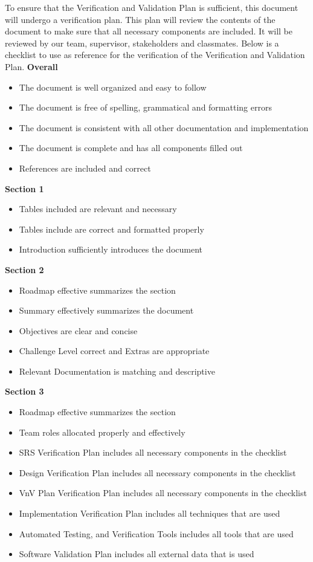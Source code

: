 \documentclass[12pt, titlepage]{article}
\begin{document}
To ensure that the Verification and Validation Plan is sufficient, this document will undergo a verification plan.
This plan will review the contents of the document to make sure that all necessary components are included.
It will be reviewed by our team, supervisor, stakeholders and classmates.
Below is a checklist to use as reference for the verification of the Verification and Validation Plan.
\bigskip
\newline
\textbf{Overall}
\begin{itemize}
  \item The document is well organized and easy to follow
  \item The document is free of spelling, grammatical and formatting errors
  \item The document is consistent with all other documentation and implementation
  \item The document is complete and has all components filled out
  \item References are included and correct
\end{itemize}
\noindent
\textbf{Section 1}
\begin{itemize}
  \item Tables included are relevant and necessary
  \item Tables include are correct and formatted properly
  \item Introduction sufficiently introduces the document
\end{itemize}
\noindent
\textbf{Section 2}
\begin{itemize}
  \item Roadmap effective summarizes the section
  \item Summary effectively summarizes the document
  \item Objectives are clear and concise
  \item Challenge Level correct and Extras are appropriate
  \item Relevant Documentation is matching and descriptive
\end{itemize}
\noindent
\textbf{Section 3}
\begin{itemize}
  \item Roadmap effective summarizes the section
  \item Team roles allocated properly and effectively
  \item SRS Verification Plan includes all necessary components in the checklist
  \item Design Verification Plan includes all necessary components in the checklist
  \item VnV Plan Verification Plan includes all necessary components in the checklist
  \item Implementation Verification Plan includes all techniques that are used
  \item Automated Testing, and Verification Tools includes all tools that are used
  \item Software Validation Plan includes all external data that is used
\end{itemize}
\end{document}
